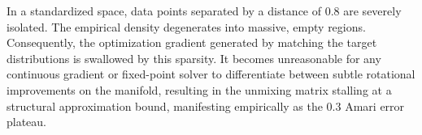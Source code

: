 \documentclass[12pt,a4paper,twoside,openany]{book}
\begin{document}
In a standardized space, data points separated by a distance of $0.8$ are severely isolated. The empirical density degenerates into massive, empty regions. 
Consequently, the optimization gradient generated by matching the target distributions is swallowed by this sparsity. It becomes unreasonable for 
any continuous gradient or fixed-point solver to differentiate between subtle rotational improvements on the manifold, 
resulting in the unmixing matrix stalling at a structural approximation bound, manifesting empirically as the $0.3$ Amari error plateau.
\backmatter


 
\end{document}
